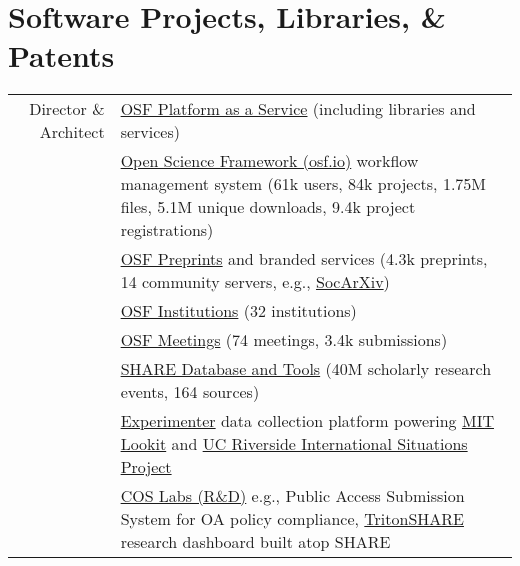\documentclass[11pt]{article}
\begin{document}
\begin{publications}
\end{publications}

\section*{Software Projects, Libraries, \& Patents}
\begin{tabularx}{\textwidth}{rX}
Director \& Architect	 & \textbullet \hspace{.25em} \href{http://github.com/CenterForOpenScience/}{OSF Platform as a Service} (including libraries and services)\\
								 & \textbullet \hspace{.25em} \href{http://osf.io}{Open Science Framework (osf.io)} workflow management system (61k users, 84k projects, 1.75M files, 5.1M unique downloads, 9.4k project registrations)\\
								 & \textbullet \hspace{.25em} \href{http://osf.io/preprints}{OSF Preprints} and branded services (4.3k preprints, 14 community servers, e.g., \href{http://osf.io/preprints/socarxiv}{SocArXiv})\\
								 & \textbullet \hspace{.25em} \href{https://cos.io/our-products/osf-institutions/}{OSF Institutions} (32 institutions)\\
								 & \textbullet \hspace{.25em} \href{https://cos.io/our-products/osf-meetings/}{OSF Meetings} (74 meetings, 3.4k submissions)\\
		                      	 & \textbullet \hspace{.25em} \href{http://share.osf.io}{SHARE Database and Tools} (40M scholarly research events, 164 sources)\\
		                      	 & \textbullet \hspace{.25em} \href{https://github.com/CenterForOpenScience/experimenter}{Experimenter} data collection platform powering \href{https://lookit.mit.edu/}{MIT Lookit} and \href{http://www.internationalsituationsproject.com/}{UC Riverside International Situations Project}\\
       			              	 & \textbullet \hspace{.25em} \href{http://github.com/cos-labs/}{COS Labs (R\&D)} e.g., Public Access Submission System for OA policy compliance, \href{http://tritonshare.ucsd.edu.com/cos-labs/}{TritonSHARE} research dashboard built atop SHARE\\

\end{tabularx}
\end{document}
